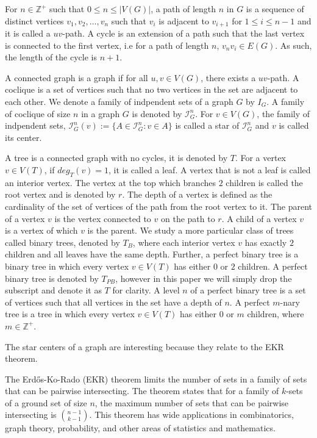 \documentclass{amsart}
\theoremstyle{definition}
\begin{document}
For $n \in \mathbb{Z^+}$ such that  $0 \leq n \leq |V(G)|$, a path of length $n$ in $G$ is a sequence of distinct vertices $v_1, v_2, \ldots, v_n$ such that $v_i$ is adjacent to $v_{i+1}$ for $1 \leq i \leq n-1$ and it is called a $uv$-path. A cycle is an extension of a path such that the last vertex is connected to the first vertex, i.e for a path of length $n$, $v_nv_i \in E(G)$. As such, the length of the cycle is $n + 1$.

A connected graph is a graph if for all $u,v \in V(G)$, there exists a $uv$-path. A coclique is a set of vertices such that no two vertices in the set are adjacent to each other. We denote a family of indpendent sets of a graph $G$ by $I_G$. A family of coclique of size $n$ in a graph $G$ is denoted by $\mathcal{I}^n_G$. For $v \in V(G)$, the family of indpendent sets, $\mathcal{I}^n_G(v) := \{A \in \mathcal{I}^n_G : v \in A\}$ is called a star of $\mathcal{I}^n_G$ and $v$ is called its center.

A tree is a connected graph with no cycles, it is denoted by $T$. For a vertex $v \in V(T)$, if $deg_T(v) = 1$, it is called a leaf. A vertex that is not a leaf is called an interior vertex. The vertex at the top which branches $2$ children is called the root vertex and is denoted by $r$. The depth of a vertex is defined as the cardinality of the set of vertices of the path from the root vertex to it. The parent of a vertex $v$ is the vertex connected to $v$ on the path to $r$. A child of a vertex $v$ is a vertex of which $v$ is the parent. We study a more particular class of trees called binary trees, denoted by $T_B$, where each interior vertex $v$ has exactly $2$ children and all leaves have the same depth. Further, a perfect binary tree is a binary tree in which every vertex $v \in V(T)$ has either $0$ or $2$ children. A perfect binary tree is denoted by $T_{PB}$, however in this paper we will simply drop the subscript and denote it as $T$ for clarity. A level $n$ of a perfect binary tree is a set of vertices such that all vertices in the set have a depth of $n$. A perfect $m$-nary tree is a tree in which every vertex $v \in V(T)$ has either $0$ or $m$ children, where $m \in \mathbb{Z}^+$.

The star centers of a graph are interesting because they relate to the EKR theorem.

The Erd\H{o}s-Ko-Rado (EKR) theorem limits the number of sets in a family of sets that can be pairwise intersecting. The theorem states that for a family of $k$-sets of a ground set of size $n$, the maximum number of sets that can be pairwise intersecting is $\binom{n-1}{k-1}$. This theorem has wide applications in combinatorics, graph theory, probability, and other areas of statistics and mathematics.
\end{document}
